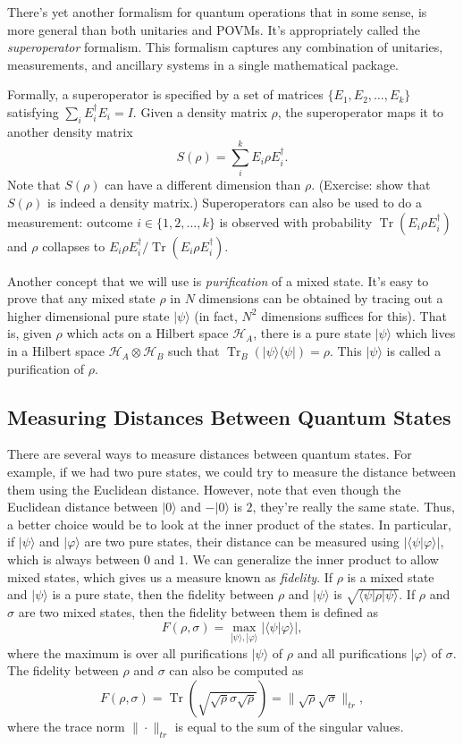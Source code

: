 \documentclass[12pt]{report}
\theoremstyle{plain}
\theoremstyle{definition}
\renewcommand{\bra}[1]{\langle#1|}
\renewcommand{\ket}[1]{|#1\rangle}
\newcommand{\braket}[2]{\langle#1|#2\rangle}
\newcommand{\ketbra}[2]{|#1\rangle\!\langle#2|}
\newcommand{\tensor}{\otimes}
\newcommand{\Tr}{\operatorname{Tr}}
\begin{document}
There's yet another formalism for quantum operations that in some sense, is more general than both unitaries and POVMs.  It's appropriately called the \emph{superoperator} formalism. This formalism captures any combination of unitaries, measurements, and ancillary systems in a single mathematical package.

Formally, a superoperator is specified by a set of matrices $\{E_1, E_2, \ldots, E_k\}$ satisfying $\sum_i E_i^\dagger E_i = I$. Given a density matrix $\rho$, the superoperator maps it to another density matrix
\[
S(\rho) = \sum_i^k E_i \rho E_i^\dagger.
\]
Note that $S(\rho)$ can have a different dimension than $\rho$. (Exercise: show that $S(\rho)$ is indeed a density matrix.) Superoperators can also be used to do a measurement: outcome $i \in \{1,2,\ldots, k\}$ is observed with probability $\Tr(E_i \rho E_i^\dagger)$ and $\rho$ collapses to $E_i \rho E_i^\dagger / \Tr(E_i \rho E_i^\dagger)$.

Another concept that we will use is  \emph{purification} of a mixed state. It's easy to prove that any mixed state $\rho$ in $N$ dimensions can be obtained by tracing out a higher dimensional pure state $\ket{\psi}$ (in fact, $N^2$ dimensions suffices for this). That is, given $\rho$ which acts on a Hilbert space $\mathcal{H}_A$, there is a pure state $\ket{\psi}$ which lives in a Hilbert space $\mathcal{H}_A \tensor \mathcal{H}_B$ such that $\Tr_B(\ketbra{\psi}{\psi}) = \rho$. This $\ket{\psi}$ is called a purification of $\rho$.


\subsection{Measuring Distances Between Quantum States}

There are several ways to measure distances between quantum states. For example, if we had two pure states, we could try to measure the distance between them using the Euclidean distance. However, note that even though the Euclidean distance between $\ket{0}$ and $-\ket{0}$ is $2$, they're really the same state. Thus, a better choice would be to look at the inner product of the states. In particular, if $\ket{\psi}$ and $\ket{\varphi}$ are two pure states, their distance can be measured using $|\braket{\psi}{\varphi}|$, which is always between $0$ and $1$. We can generalize the inner product to allow mixed states, which gives us a measure known as \emph{fidelity}. If $\rho$ is a mixed state and $\ket{\psi}$ is a pure state, then the fidelity between $\rho$ and $\ket{\psi}$ is $\sqrt{ \bra{\psi} \rho \ket{\psi} }$. If $\rho$ and $\sigma$ are two mixed states, then the fidelity between them is defined as
\[
F(\rho, \sigma) = \max_{\ket{\psi}, \ket{\varphi}} | \braket{\psi}{\varphi} |,
\]
where the maximum is over all purifications $\ket{\psi}$ of $\rho$ and all purifications $\ket{\varphi}$ of $\sigma$. The fidelity between $\rho$ and $\sigma$ can also be computed as
\[
F(\rho, \sigma) = \Tr\left(\sqrt{ \sqrt{\rho} \sigma \sqrt{\rho}}\right) = \| \sqrt{\rho} \sqrt{\sigma} \|_{tr},
\]
where the trace norm $\| \cdot \|_{tr}$ is equal to the sum of the singular values.
\end{document}
